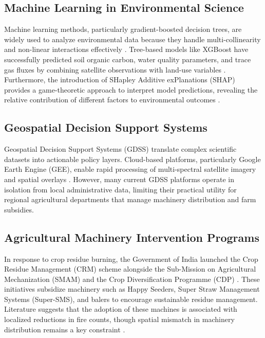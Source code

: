 \documentclass[12pt,a4paper]{report}
\begin{document}
\subsection{Machine Learning in Environmental Science}
Machine learning methods, particularly gradient-boosted decision trees, are widely used to analyze environmental data because they handle multi-collinearity and non-linear interactions effectively \citep{chen2016xgboost, elith2008working}. Tree-based models like XGBoost have successfully predicted soil organic carbon, water quality parameters, and trace gas fluxes by combining satellite observations with land-use variables \citep{friedman2001greedy}. Furthermore, the introduction of SHapley Additive exPlanations (SHAP) provides a game-theoretic approach to interpret model predictions, revealing the relative contribution of different factors to environmental outcomes \citep{lundberg2017unified}.

\subsection{Geospatial Decision Support Systems}
Geospatial Decision Support Systems (GDSS) translate complex scientific datasets into actionable policy layers. Cloud-based platforms, particularly Google Earth Engine (GEE), enable rapid processing of multi-spectral satellite imagery and spatial overlays \citep{gorelick2017google}. However, many current GDSS platforms operate in isolation from local administrative data, limiting their practical utility for regional agricultural departments that manage machinery distribution and farm subsidies.

\subsection{Agricultural Machinery Intervention Programs}
In response to crop residue burning, the Government of India launched the Crop Residue Management (CRM) scheme alongside the Sub-Mission on Agricultural Mechanization (SMAM) and the Crop Diversification Programme (CDP) \citep{singh2020paddy}. These initiatives subsidize machinery such as Happy Seeders, Super Straw Management Systems (Super-SMS), and balers to encourage sustainable residue management. Literature suggests that the adoption of these machines is associated with localized reductions in fire counts, though spatial mismatch in machinery distribution remains a key constraint \citep{shyamsundar2019fields, kumar2015crop}.
\end{document}
